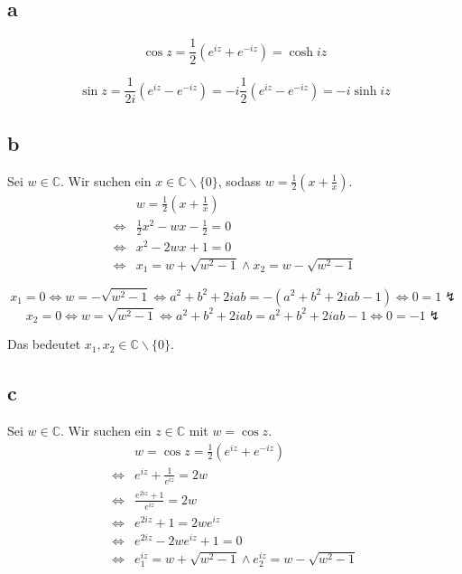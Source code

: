 \documentclass[a4paper,10pt]{article}
\begin{document}
\subsection*{a}

\begin{equation}
 \cos z = \frac{1}{2}(e^{iz} + e^{-iz}) = \cosh iz
\end{equation}

\begin{equation}
 \sin z = \frac{1}{2i}(e^{iz} - e^{-iz}) = -i\frac{1}{2}(e^{iz} - e^{-iz}) = -i \sinh iz
\end{equation}

\subsection*{b}

Sei $w \in \mathbb{C}$.
Wir suchen ein $x \in \mathbb{C} \backslash \{0\}$, sodass $w = \frac{1}{2}(x + \frac{1}{x})$.
\begin{align}
 & w = \frac{1}{2}(x + \frac{1}{x})\\
 \Leftrightarrow & \frac{1}{2}x^2 - wx - \frac{1}{2} = 0\\
 \Leftrightarrow & x^2 - 2wx + 1 = 0\\
 \Leftrightarrow & x_1 = w + \sqrt{w^2 - 1} \land x_2 = w - \sqrt{w^2 - 1}
\end{align}

\begin{equation}
 x_1 = 0 \Leftrightarrow w = -\sqrt{w^2 - 1} \Leftrightarrow a^2 + b^2 + 2iab = -(a^2 + b^2 + 2iab - 1) \Leftrightarrow 0 = 1 \lightning
\end{equation}
\begin{equation}
 x_2 = 0 \Leftrightarrow w = \sqrt{w^2 - 1} \Leftrightarrow a^2 + b^2 + 2iab = a^2 + b^2 + 2iab - 1 \Leftrightarrow 0 = -1 \lightning
\end{equation}

Das bedeutet $x_1, x_2 \in \mathbb{C} \backslash \{0\}$.

\subsection*{c}

Sei $w \in \mathbb{C}$.
Wir suchen ein $z \in \mathbb{C}$ mit $w = \cos z$.
\begin{align}
 & w = \cos z = \frac{1}{2}(e^{iz} + e^{-iz})\\
 \Leftrightarrow & e^{iz} + \frac{1}{e^{iz}} = 2w\\
 \Leftrightarrow & \frac{e^{2iz} + 1}{e^{iz}} = 2w\\
 \Leftrightarrow & e^{2iz} + 1 = 2we^{iz}\\
 \Leftrightarrow & e^{2iz} - 2we^{iz} + 1 = 0\\
 \Leftrightarrow & e^{iz}_1 = w + \sqrt{w^2 - 1} \land e^{iz}_2 = w - \sqrt{w^2 - 1}
\end{align}
\end{document}
